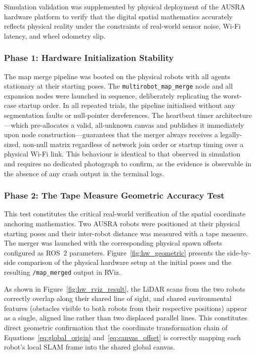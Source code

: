 Simulation validation was supplemented by physical deployment of the AUSRA hardware platform to verify that the digital spatial mathematics accurately reflects physical reality under the constraints of real-world sensor noise, Wi-Fi latency, and wheel odometry slip.

\subsubsection{Phase 1: Hardware Initialization Stability}

The map merge pipeline was booted on the physical robots with all agents stationary at their starting poses. The \texttt{multirobot\_map\_merge} node and all expansion nodes were launched in sequence, deliberately replicating the worst-case startup order. In all repeated trials, the pipeline initialised without any segmentation faults or null-pointer dereferences. The heartbeat timer architecture---which pre-allocates a valid, all-unknown canvas and publishes it immediately upon node construction---guarantees that the merger always receives a legally-sized, non-null matrix regardless of network join order or startup timing over a physical Wi-Fi link. This behaviour is identical to that observed in simulation and requires no dedicated photograph to confirm, as the evidence is observable in the absence of any crash output in the terminal logs.

\subsubsection{Phase 2: The Tape Measure Geometric Accuracy Test}

This test constitutes the critical real-world verification of the spatial coordinate anchoring mathematics. Two AUSRA robots were positioned at their physical starting poses and their inter-robot distance was measured with a tape measure. The merger was launched with the corresponding physical spawn offsets configured as ROS~2 parameters. Figure~\ref{fig:hw_geometric} presents the side-by-side comparison of the physical hardware setup at the initial poses and the resulting \texttt{/map\_merged} output in RViz.

As shown in Figure~\ref{fig:hw_rviz_result}, the LiDAR scans from the two robots correctly overlap along their shared line of sight, and shared environmental features (obstacles visible to both robots from their respective positions) appear as a single, aligned line rather than two displaced parallel lines. This constitutes direct geometric confirmation that the coordinate transformation chain of Equations~\ref{eq:global_origin} and~\ref{eq:canvas_offset} is correctly mapping each robot's local SLAM frame into the shared global canvas.

